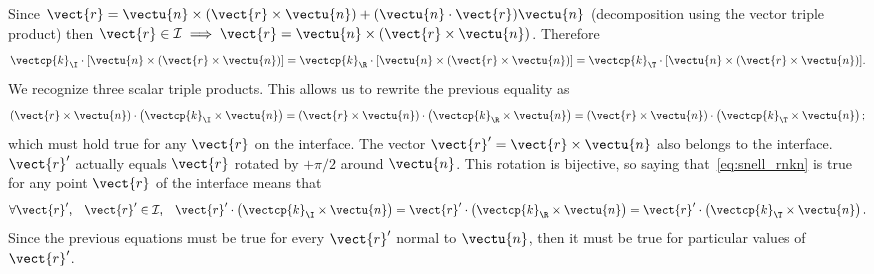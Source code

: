 \begin{refsection}
Since
$
    \vect{r} =
    \vectu{n} \times (\vect{r} \times \vectu{n}) +
    (\vectu{n} \cdot \vect{r}) \vectu{n}
$
(decomposition using the vector triple product) then
$
    \vect{r} \in \mathcal{I}
    \implies
    \vect{r} = \vectu{n} \times (\vect{r} \times \vectu{n})
$.
Therefore
\begin{equation}
    \vectcp{k}_\I \cdot [\vectu{n} \times (\vect{r} \times \vectu{n})]
    =
    \vectcp{k}_\R \cdot [\vectu{n} \times (\vect{r} \times \vectu{n})]
    =
    \vectcp{k}_\T \cdot [\vectu{n} \times (\vect{r} \times \vectu{n})]
    \text{.}
\end{equation}
We recognize three scalar triple products.
This allows us to rewrite the previous equality as
\begin{equation}
    (\vect{r} \times \vectu{n}) \cdot \left(\vectcp{k}_\I \times \vectu{n}\right)
    =
    (\vect{r} \times \vectu{n}) \cdot \left(\vectcp{k}_\R \times \vectu{n}\right)
    =
    (\vect{r} \times \vectu{n}) \cdot \left(\vectcp{k}_\T \times \vectu{n}\right)
    \text{;}
    \label{eq:snell_rnkn}
\end{equation}
which must hold true for any $\vect{r}$ on the interface.
The vector $\vect{r}' = \vect{r} \times \vectu{n}$ also belongs to the interface.
$\vect{r}'$ actually equals $\vect{r}$ rotated by $+\pi/2$ around $\vectu{n}$.
This rotation is bijective, so saying that~\cref{eq:snell_rnkn} is true for any point $\vect{r}$ of the interface means that
\begin{equation}
    \forall \vect{r}'\text{,}\quad
    \vect{r}' \in \mathcal{I}\text{,}\quad
    \vect{r}' \cdot \left(\vectcp{k}_\I \times \vectu{n}\right)
    =
    \vect{r}' \cdot \left(\vectcp{k}_\R \times \vectu{n}\right)
    =
    \vect{r}' \cdot \left(\vectcp{k}_\T \times \vectu{n}\right)
    \text{.}
    \label{eq:snell_rkn}
\end{equation}
Since the previous equations must be true for every $\vect{r}'$ normal to $\vectu{n}$,
then it must be true for particular values of $\vect{r}'$.


\end{refsection}
